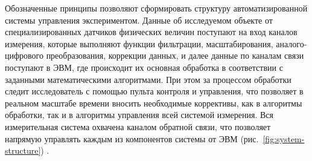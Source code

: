 \documentclass[a4paper, 14pt, titlepage]{extarticle}
\begin{document}
  Обозначенные принципы позволяют сформировать структуру автоматизированной системы управления
  экспериментом. Данные об исследуемом объекте от специализированных датчиков физических величин
  поступают на вход каналов измерения, которые выполняют функции фильтрации, масштабирования,
  аналого-цифрового преобразования, коррекции данных, и далее данные по каналам связи поступают в
  ЭВМ, где происходит их основная обработка в соответствии с заданными математическими алгоритмами.
  При этом за процессом обработки следит исследователь с помощью пульта контроля и управления, что
  позволяет в реальном масштабе времени вносить необходимые коррективы, как в алгоритмы обработки,
  так и в алгоритмы управления всей системой измерения. Вся измерительная система охвачена каналом
  обратной связи, что позволяет напрямую управлять каждым из компонентов системы от ЭВМ
  (рис.~\ref{fig:system-structure}) \cite{kuzmichev-automation}.
\end{document}
